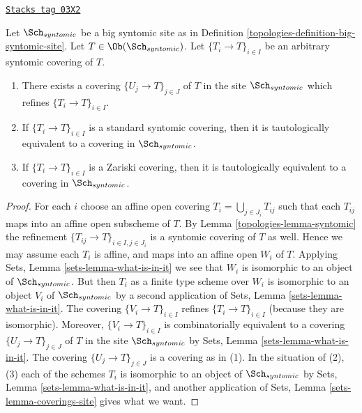 \begin{lemma}
\label{topologies-lemma-syntomic-induced}
\href{https://stacks.math.columbia.edu/tag/03X2}{\texttt{Stacks tag 03X2}}

Let $\Sch_{syntomic}$ be a big syntomic site as in
Definition \ref{topologies-definition-big-syntomic-site}.
Let $T \in \Ob(\Sch_{syntomic})$.
Let $\{T_i \to T\}_{i \in I}$ be an arbitrary syntomic covering of $T$.
\begin{enumerate}
\item There exists a covering $\{U_j \to T\}_{j \in J}$ of $T$ in the site
$\Sch_{syntomic}$ which refines $\{T_i \to T\}_{i \in I}$.
\item If $\{T_i \to T\}_{i \in I}$ is a standard syntomic covering, then
it is tautologically equivalent to a covering in $\Sch_{syntomic}$.
\item If $\{T_i \to T\}_{i \in I}$ is a Zariski covering, then
it is tautologically equivalent to a covering in $\Sch_{syntomic}$.
\end{enumerate}
\end{lemma}

\begin{proof}

For each $i$ choose an affine open covering $T_i = \bigcup_{j \in J_i} T_{ij}$
such that each $T_{ij}$ maps into an affine open subscheme of $T$. By
Lemma \ref{topologies-lemma-syntomic}
the refinement $\{T_{ij} \to T\}_{i \in I, j \in J_i}$ is a syntomic covering
of $T$ as well. Hence we may assume each $T_i$ is affine, and maps into
an affine open $W_i$ of $T$. Applying
Sets, Lemma \ref{sets-lemma-what-is-in-it}
we see that $W_i$ is isomorphic to an object of $\Sch_{syntomic}$.
But then $T_i$ as a finite type scheme over $W_i$
is isomorphic to an object $V_i$ of $\Sch_{syntomic}$ by a second
application of
Sets, Lemma \ref{sets-lemma-what-is-in-it}.
The covering $\{V_i \to T\}_{i \in I}$ refines $\{T_i \to T\}_{i \in I}$
(because they are isomorphic).
Moreover, $\{V_i \to T\}_{i \in I}$ is combinatorially equivalent to a
covering $\{U_j \to T\}_{j \in J}$ of $T$ in the site
$\Sch_{syntomic}$ by
Sets, Lemma \ref{sets-lemma-what-is-in-it}.
The covering $\{U_j \to T\}_{j \in J}$ is a covering as in (1).
In the situation of (2), (3) each of the
schemes $T_i$ is isomorphic to an object of $\Sch_{syntomic}$ by
Sets, Lemma \ref{sets-lemma-what-is-in-it},
and another application of
Sets, Lemma \ref{sets-lemma-coverings-site}
gives what we want.
\end{proof}

